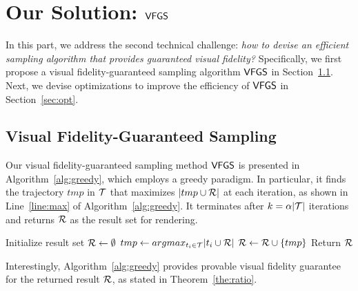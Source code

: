 \section{Our Solution: $\mathsf{VFGS}$}\label{sec:sol}
In this part, we address the second technical challenge: \emph{how to devise an efficient sampling algorithm that provides guaranteed visual fidelity?}
Specifically, we first propose a visual fidelity-guaranteed sampling algorithm $\mathsf{VFGS}$ in Section~\ref{sec:greedy}. Next, we devise optimizations to improve the efficiency of $\mathsf{VFGS}$ in Section~\ref{sec:opt}.

\subsection{Visual Fidelity-Guaranteed Sampling}\label{sec:greedy}

Our visual fidelity-guaranteed sampling method $\mathsf{VFGS}$ is presented in Algorithm~\ref{alg:greedy}, which employs a greedy paradigm.
In particular, it finds the trajectory $tmp$ in $\mathcal{T}$ that maximizes $| tmp \cup \mathcal{R}|$ at each iteration, as shown in Line~\ref{line:max} of Algorithm~\ref{alg:greedy}.
It terminates after $k=\alpha |\mathcal{T}|$ iterations and returns $\mathcal{R}$ as the result set for rendering.

\begin{algorithm}
    \caption{$\vats(\D,k=\alpha |\D|)$} \label{alg:greedy}
    \begin{algorithmic}[1]
    \State Initialize result set $\mathcal{R} \leftarrow \emptyset$
        \State $tmp \leftarrow argmax_{t_i \in \mathcal{T}} |t_i \cup \mathcal{R}|$ \label{line:max}
        \State $\mathcal{R} \leftarrow \mathcal{R} \cup \{ tmp \}$
    \EndWhile
    \State Return $\mathcal{R}$
    \end{algorithmic}
\end{algorithm}


Interestingly, Algorithm~\ref{alg:greedy} provides provable visual fidelity guarantee for the returned result $\mathcal{R}$, as stated in Theorem~\ref{the:ratio}.


